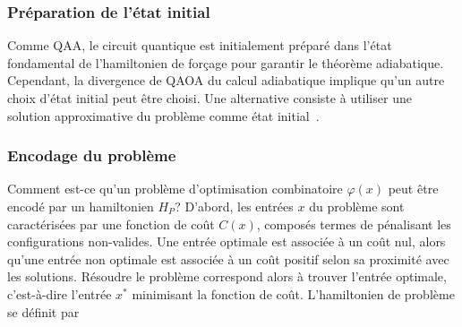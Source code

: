 \subsubsection{Préparation de l'état initial}
\label{subsec:preparation-de-etat-initial}

Comme QAA, le circuit quantique est initialement préparé dans l'état fondamental de l'hamiltonien de forçage pour garantir le théorème adiabatique. Cependant, la divergence de QAOA du calcul adiabatique implique qu'un autre choix d'état initial peut être choisi. Une alternative consiste à utiliser une solution approximative du problème comme état initial~\cite{eggerWarmstartingQuantumOptimization2021}. 


\subsubsection{Encodage du problème}
\label{subsec:encodage-probleme}

Comment est-ce qu'un problème d'optimisation combinatoire $\varphi(x)$ peut être encodé par un hamiltonien $H_{P}$? D'abord, les entrées $x$ du problème sont caractérisées par une fonction de coût $C(x)$, composés termes de pénalisant les configurations non-valides. Une entrée optimale est associée à un coût nul, alors qu'une entrée non optimale est associée à un coût positif selon sa proximité avec les solutions. Résoudre le problème correspond alors à trouver l'entrée optimale, c'est-à-dire l'entrée $x^{*}$ minimisant la fonction de coût. L'hamiltonien de problème se définit par

